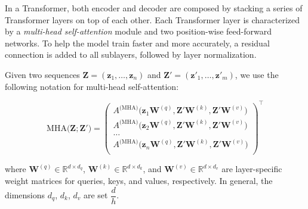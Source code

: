 In a Transformer, both encoder and decoder are composed by stacking a series of Transformer layers on top of each other. Each Transformer layer is characterized by a \textit{multi-head self-attention} module and two position-wise feed-forward networks. To help the model train faster and more accurately, a residual connection \citep{he2016deep} is added to all sublayers, followed by layer normalization.

Given two sequences $\bm{Z} = (\bm{z}_1, \ldots, \bm{z}_n)$ and $\bm{Z'} = (\bm{z'}_1, \ldots, \bm{z'}_m)$, we use the following notation for multi-head self-attention:

\begin{equation}
    \textrm{MHA}\bigl(\bm{Z}; \bm{Z'}\bigr) = 
    {\begin{pmatrix}
    A^{\textrm{(MHA)}}\bigl(\bm{z}_1 \bm{W}^{(q)}, \bm{Z'}\bm{W}^{(k)}, \bm{Z}'\bm{W}^{(v)}\bigr)\\ 
    A^{\textrm{(MHA)}}\bigl(\bm{z}_2 \bm{W}^{(q)}, \bm{Z'}\bm{W}^{(k)}, \bm{Z}'\bm{W}^{(v)}\bigr)\\ 
    \ldots \\
    A^{\textrm{(MHA)}}\bigl(\bm{z}_n \bm{W}^{(q)}, \bm{Z'}\bm{W}^{(k)}, \bm{Z}'\bm{W}^{(v)}\bigr) \\
    \end{pmatrix}}^{\top}
\end{equation}

\noindent where $\bm{W}^{(q)} \in \mathbb{R}^{d \times d_q}$, $\bm{W}^{(k)} \in \mathbb{R}^{d \times d_k}$, and $\bm{W}^{(v)} \in \mathbb{R}^{d \times d_v}$ are layer-specific weight matrices for queries, keys, and values, respectively. In general, the dimensions $d_q$, $d_k$, $d_v$ are set $\dfrac{d}{h}$.



